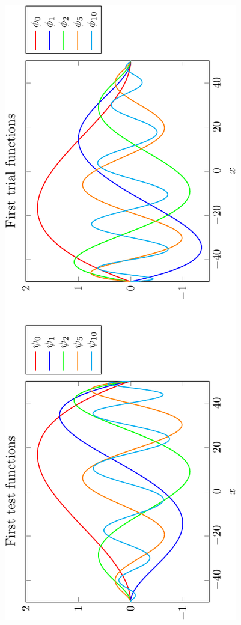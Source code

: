 \begin{center}
\begin{figure}[!h]
\includegraphics[scale=0.7,angle=270]{images/plotbasis2.pdf}
\end{figure}
\end{center}



